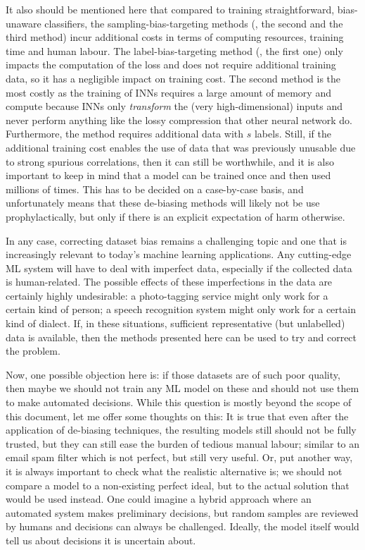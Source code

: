 It also should be mentioned here that compared to training straightforward, bias-unaware
classifiers, the sampling-bias-targeting methods (\ie, the second and the third method) incur
additional costs in terms of computing resources, training time and human labour. The
label-bias-targeting method (\ie, the first one) only impacts the computation of the loss and does
not require additional training data, so it has a negligible impact on training cost. The second
method is the most costly as the training of \acp{INN} requires a large amount of memory and
compute because \acp{INN} only \emph{transform} the (very high-dimensional) inputs and never
perform anything like the lossy compression that other neural network do. Furthermore, the method
requires additional data with \(s\) labels. Still, if the additional training cost enables the use
of data that was previously unusable due to strong spurious correlations, then it can still be
worthwhile, and it is also important to keep in mind that a model can be trained once and then used
millions of times. This has to be decided on a case-by-case basis, and unfortunately means that
these de-biasing methods will likely not be use prophylactically, but only if there is an explicit
expectation of harm otherwise.

In any case, correcting dataset bias remains a challenging topic and one that is increasingly
relevant to today's machine learning applications. Any cutting-edge \ac{ML} system will have to
deal with imperfect data, especially if the collected data is human-related. The possible effects
of these imperfections in the data are certainly highly undesirable: a photo-tagging service might
only work for a certain kind of person; a speech recognition system might only work for a certain
kind of dialect. If, in these situations, sufficient representative (but unlabelled) data is
available, then the methods presented here can be used to try and correct the problem.

Now, one possible objection here is: if those datasets are of such poor quality, then maybe we
should not train any \ac{ML} model on these and should not use them to make automated decisions.
While this question is mostly beyond the scope of this document, let me offer some thoughts on
this: It is true that even after the application of de-biasing techniques, the resulting models
still should not be fully trusted, but they can still ease the burden of tedious manual labour;
similar to an email spam filter which is not perfect, but still very useful. Or, put another way,
it is always important to check what the realistic alternative is; we should not compare a model to
a non-existing perfect ideal, but to the actual solution that would be used instead. One could
imagine a hybrid approach where an automated system makes preliminary decisions, but random samples
are reviewed by humans and decisions can always be challenged. Ideally, the model itself would tell
us about decisions it is uncertain about.

